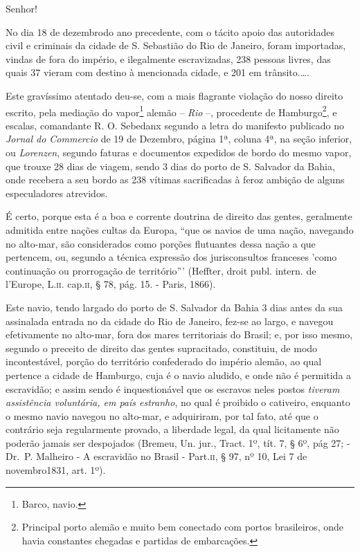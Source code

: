 \asterisc{}

Senhor!

No dia 18 de dezembrodo ano precedente, com o tácito apoio das
autoridades civil e criminais da cidade de S. Sebastião do Rio de
Janeiro, foram importadas, vindas de fora do império, e ilegalmente
escravizadas, 238 pessoas livres, das quais 37 vieram com destino à
mencionada cidade, e 201 em trânsito.\ldots.

Este gravíssimo atentado deu-se, com a mais flagrante violação do nosso
direito escrito, pela mediação do vapor\footnote{ Barco, navio.} alemão
-- \emph{Rio} --, procedente de Hamburgo\footnote{ Principal porto
  alemão e muito bem conectado com portos brasileiros, onde havia
  constantes chegadas e partidas de embarcações.}, e escalas, comandante
R. O. Sebedanx segundo a letra do manifesto publicado no \emph{Jornal do
Commercio} de 19 de Dezembro, página 1ª, coluna 4ª, na seção inferior,
ou \emph{Lorenzen}, segundo faturas e documentos expedidos de bordo do
mesmo vapor, que trouxe 28 dias de viagem, sendo 3 dias do porto de S.
Salvador da Bahia, onde recebera a seu bordo as 238 vítimas sacrificadas
à feroz ambição de alguns especuladores atrevidos.

É certo, porque esta é a boa e corrente doutrina de direito das gentes,
geralmente admitida entre nações cultas da Europa, ``que os navios de uma
nação, navegando no alto-mar, são considerados como porções flutuantes
dessa nação a que pertencem, ou, segundo a técnica expressão dos
jurisconsultos franceses 'como continuação ou prorrogação de
território''' (Heffter, droit publ. intern. de l'Europe, L.\textsc{ii}. cap.\textsc{ii},
§ 78, pág. 15. - Paris, 1866).

Este navio, tendo largado do porto de S. Salvador da Bahia 3 dias antes
da sua assinalada entrada no da cidade do Rio de Janeiro, fez-se ao
largo, e navegou efetivamente no alto-mar, fora dos mares territoriais
do Brasil; e, por isso mesmo, segundo o preceito de direito das gentes
supracitado, constituiu, de modo incontestável, porção do território
confederado do império alemão, ao qual pertence a cidade de Hamburgo,
cuja é o navio aludido, e onde não é permitida a escravidão; e assim
sendo é inquestionável que os escravos neles postos \emph{tiveram
assistência voluntária, em país estranho}, no qual é proibido o
cativeiro, enquanto o mesmo navio navegou no alto-mar, e adquiriram, por
tal fato, até que o contrário seja regularmente provado, a liberdade
legal, da qual licitamente não poderão jamais ser despojados (Bremeu,
Un. jur., Tract. 1º, tít. 7, § 6º, pág 27; - Dr.~P. Malheiro - A
escravidão no Brasil - Part.\textsc{ii}, § 97, nº 10, Lei 7 de novembro1831,
art. 1º).

